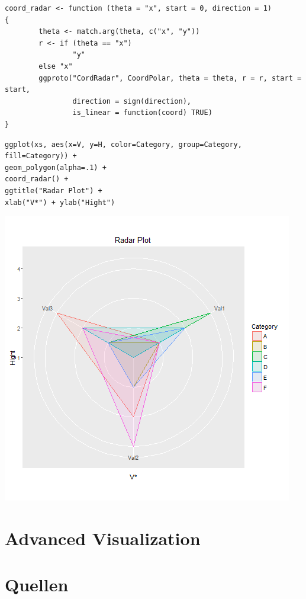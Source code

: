 \documentclass[a4paper, captions=tableheading]{tufte-book}
\begin{document}
\begin{verbatim}
coord_radar <- function (theta = "x", start = 0, direction = 1)
{
		theta <- match.arg(theta, c("x", "y"))
		r <- if (theta == "x")
				"y"
		else "x"
		ggproto("CordRadar", CoordPolar, theta = theta, r = r, start = start,
				direction = sign(direction),
				is_linear = function(coord) TRUE)
}
\end{verbatim}


\begin{verbatim}
ggplot(xs, aes(x=V, y=H, color=Category, group=Category, fill=Category)) +
geom_polygon(alpha=.1) +
coord_radar() +
ggtitle("Radar Plot") +
xlab("V*") + ylab("Hight")
\end{verbatim}

\includegraphics[width=.9\linewidth]{img/radar-01.png}

\chapter{Advanced Visualization}
\label{sec:orgheadline17}



\chapter{Quellen}
\label{sec:orgheadline20}
\end{document}
